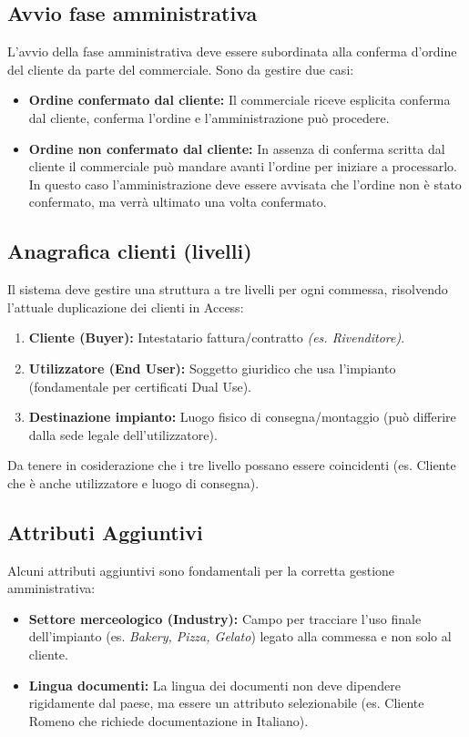\documentclass[12pt, a4paper]{article} %
\begin{document}
\subsection{Avvio fase amministrativa}
L'avvio della fase amministrativa deve essere subordinata alla conferma
d'ordine del cliente da parte del commerciale. Sono da gestire due casi:
\begin{itemize}
      \item \textbf{Ordine confermato dal cliente:} Il commerciale riceve esplicita conferma dal cliente,
            conferma l'ordine e l'amministrazione può procedere.
      \item \textbf{Ordine non confermato dal cliente:} In assenza di conferma scritta dal cliente il commerciale può mandare avanti l'ordine per iniziare a processarlo.
            In questo caso l'amministrazione deve essere avvisata che l'ordine non è stato confermato, ma verrà ultimato una volta confermato.
\end{itemize}

\subsection{Anagrafica clienti (livelli)}
Il sistema deve gestire una struttura a tre livelli per ogni commessa,
risolvendo l'attuale duplicazione dei clienti in Access:
\begin{enumerate}
      \item \textbf{Cliente (Buyer):} Intestatario fattura/contratto \textit{(es. Rivenditore)}.
      \item \textbf{Utilizzatore (End User):} Soggetto giuridico che usa l'impianto (fondamentale per certificati Dual Use).
      \item \textbf{Destinazione impianto:} Luogo fisico di consegna/montaggio (può differire dalla sede legale dell'utilizzatore).
\end{enumerate}
Da tenere in cosiderazione che i tre livello possano essere coincidenti
(es. Cliente che è anche utilizzatore e luogo di consegna).

\subsection{Attributi Aggiuntivi}
Alcuni attributi aggiuntivi sono fondamentali per la corretta gestione
amministrativa:
\begin{itemize}
      \item \textbf{Settore merceologico (Industry):} Campo per tracciare l'uso finale dell'impianto (es. \textit{Bakery, Pizza, Gelato}) legato alla commessa e non solo al cliente.
      \item \textbf{Lingua documenti:} La lingua dei documenti non deve dipendere rigidamente dal paese, ma essere un attributo selezionabile (es. Cliente Romeno che richiede documentazione in Italiano).
\end{itemize}
\end{document}
